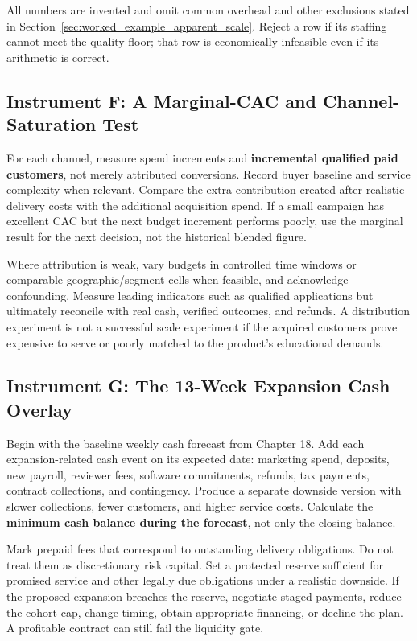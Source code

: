 All numbers are invented and omit common overhead and other exclusions stated in Section~\ref{sec:worked_example_apparent_scale}. Reject a row if its staffing cannot meet the quality floor; that row is economically infeasible even if its arithmetic is correct.

\subsection{Instrument F: A Marginal-CAC and Channel-Saturation Test}
\label{sec:instrument_f_marginal_cac_test}

For each channel, measure spend increments and \textbf{incremental qualified paid customers}, not merely attributed conversions. Record buyer baseline and service complexity when relevant. Compare the extra contribution created after realistic delivery costs with the additional acquisition spend. If a small campaign has excellent CAC but the next budget increment performs poorly, use the marginal result for the next decision, not the historical blended figure.

Where attribution is weak, vary budgets in controlled time windows or comparable geographic/segment cells when feasible, and acknowledge confounding. Measure leading indicators such as qualified applications but ultimately reconcile with real cash, verified outcomes, and refunds. A distribution experiment is not a successful scale experiment if the acquired customers prove expensive to serve or poorly matched to the product's educational demands.

\subsection{Instrument G: The 13-Week Expansion Cash Overlay}
\label{sec:instrument_g_13_week_cash_overlay}

Begin with the baseline weekly cash forecast from Chapter 18. Add each expansion-related cash event on its expected date: marketing spend, deposits, new payroll, reviewer fees, software commitments, refunds, tax payments, contract collections, and contingency. Produce a separate downside version with slower collections, fewer customers, and higher service costs. Calculate the \textbf{minimum cash balance during the forecast}, not only the closing balance.

Mark prepaid fees that correspond to outstanding delivery obligations. Do not treat them as discretionary risk capital. Set a protected reserve sufficient for promised service and other legally due obligations under a realistic downside. If the proposed expansion breaches the reserve, negotiate staged payments, reduce the cohort cap, change timing, obtain appropriate financing, or decline the plan. A profitable contract can still fail the liquidity gate.


